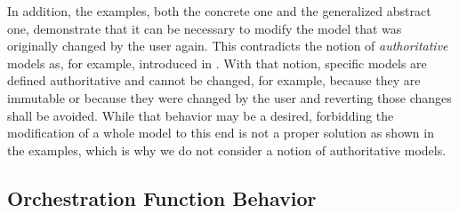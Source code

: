 In addition, the examples, both the concrete one and the generalized abstract one, demonstrate that it can be necessary to modify the model that was originally changed by the user again.
This contradicts the notion of \emph{authoritative} models as, for example, introduced in \cite{stevens2020BidirectionalTransformationLarge-SoSym}.
With that notion, specific models are defined authoritative and cannot be changed, for example, because they are immutable or because they were changed by the user and reverting those changes shall be avoided.
While that behavior may be a desired, forbidding the modification of a whole model to this end is not a proper solution as shown in the examples, which is why we do not consider a notion of authoritative models.







\subsection{Orchestration Function Behavior} %
\label{chap:orchestration:problem:function_behavior}

